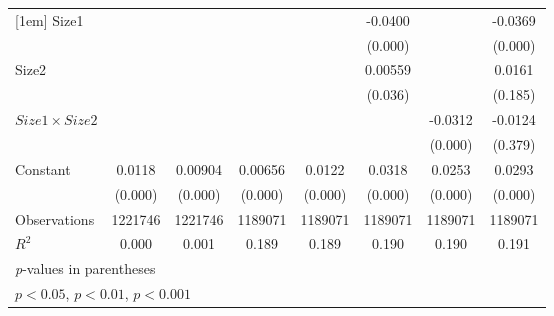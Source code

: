{\begin{tabular}{l*{7}{c}}
[1em]
Size1               &                     &                     &                     &                     &     -0.0400\sym{***}&                     &     -0.0369\sym{***}\\
                    &                     &                     &                     &                     &     (0.000)         &                     &     (0.000)         \\
[1em]
Size2               &                     &                     &                     &                     &     0.00559\sym{*}  &                     &      0.0161         \\
                    &                     &                     &                     &                     &     (0.036)         &                     &     (0.185)         \\
[1em]
$ Size1 \times Size2 $&                     &                     &                     &                     &                     &     -0.0312\sym{***}&     -0.0124         \\
                    &                     &                     &                     &                     &                     &     (0.000)         &     (0.379)         \\
[1em]
Constant            &      0.0118\sym{***}&     0.00904\sym{***}&     0.00656\sym{***}&      0.0122\sym{***}&      0.0318\sym{***}&      0.0253\sym{***}&      0.0293\sym{***}\\
                    &     (0.000)         &     (0.000)         &     (0.000)         &     (0.000)         &     (0.000)         &     (0.000)         &     (0.000)         \\
\hline
Observations        &     1221746         &     1221746         &     1189071         &     1189071         &     1189071         &     1189071         &     1189071         \\
\(R^{2}\)           &       0.000         &       0.001         &       0.189         &       0.189         &       0.190         &       0.190         &       0.191         \\
\hline\hline
\multicolumn{8}{l}{\footnotesize \textit{p}-values in parentheses}\\
\multicolumn{8}{l}{\footnotesize \sym{*} \(p<0.05\), \sym{**} \(p<0.01\), \sym{***} \(p<0.001\)}\\
\end{tabular}
}
